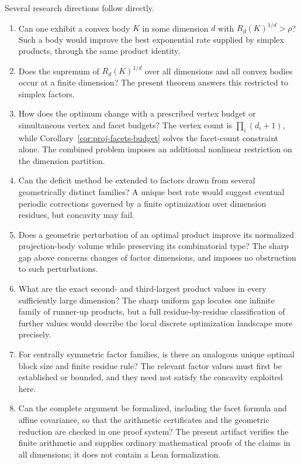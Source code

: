 Several research directions follow directly.
\begin{enumerate}
 \item Can one exhibit a convex body $K$ in some dimension $d$ with
 $R_d(K)^{1/d}>\rho$? Such a body would improve the best exponential
 rate supplied by simplex products, through the same product identity.
 \item Does the supremum of $R_d(K)^{1/d}$ over all dimensions and all
 convex bodies occur at a finite dimension? The present theorem
 answers this restricted to simplex factors.
 \item How does the optimum change with a prescribed vertex budget
 or simultaneous vertex and facet budgets? The vertex count is
 $\prod_i(d_i+1)$, while Corollary~\ref{cor:proj-facets-budget} solves
 the facet-count constraint alone. The combined problem imposes an
 additional nonlinear restriction on the dimension partition.
 \item Can the deficit method be extended to factors drawn from
 several geometrically distinct families? A unique best rate would
 suggest eventual periodic corrections governed by a finite
 optimization over dimension residues, but concavity may fail.
 \item Does a geometric perturbation of an optimal product improve
 its normalized projection-body volume while preserving its
 combinatorial type? The sharp gap above concerns changes of factor
 dimensions, and imposes no obstruction to such perturbations.
 \item What are the exact second- and third-largest product values
 in every sufficiently large dimension? The sharp uniform gap locates
 one infinite family of runner-up products, but a full residue-by-residue
 classification of further values would describe the local discrete
 optimization landscape more precisely.
 \item For centrally symmetric factor families, is there an analogous
 unique optimal block size and finite residue rule? The relevant
 factor values must first be established or bounded, and they need
 not satisfy the concavity exploited here.
 \item Can the complete argument be formalized, including the facet
 formula and affine covariance, so that the arithmetic certificates
 and the geometric reduction are checked in one proof system?
 The present artifact verifies the finite arithmetic and supplies
 ordinary mathematical proofs of the claims in all dimensions;
 it does not contain a Lean formalization.
\end{enumerate}
